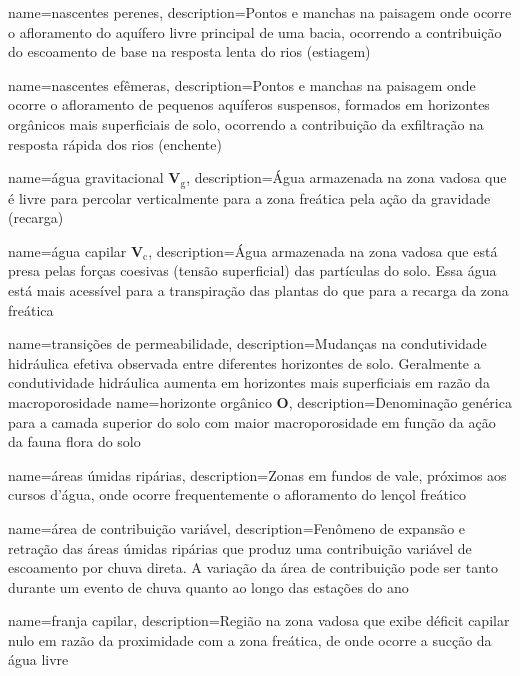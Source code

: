 {
    name=nascentes perenes,
    description={Pontos e manchas na paisagem onde ocorre o afloramento do aquífero livre principal de uma bacia, ocorrendo a contribuição do escoamento de base na resposta lenta do rios (estiagem)}
}

{
    name=nascentes efêmeras,
    description={Pontos e manchas na paisagem onde ocorre o afloramento de pequenos aquíferos suspensos, formados em horizontes orgânicos mais superficiais de solo, ocorrendo a contribuição da exfiltração na resposta rápida dos rios (enchente)}
}

{
    name=água gravitacional $\textbf{V}_{\text{g}}$,
    description={Água armazenada na zona vadosa que é livre para percolar verticalmente para a zona freática pela ação da gravidade (recarga)}
}

{
    name=água capilar $\textbf{V}_{\text{c}}$,
    description={Água armazenada na zona vadosa que está presa pelas forças coesivas (tensão superficial) das partículas do solo. Essa água está mais acessível para a transpiração das plantas do que para a recarga da zona freática}
}

{
    name=transições de permeabilidade,
    description={Mudanças na condutividade hidráulica efetiva observada entre diferentes horizontes de solo. Geralmente a condutividade hidráulica aumenta em horizontes mais superficiais em razão da macroporosidade}
}
{
    name=horizonte orgânico $\textbf{O}$,
    description={Denominação genérica para a camada superior do solo com maior macroporosidade em função da ação da fauna flora do solo}
}

{
    name=áreas úmidas ripárias,
    description={Zonas em fundos de vale, próximos aos cursos d'água, onde ocorre frequentemente o afloramento do lençol freático}
}

{
    name=área de contribuição variável,
    description={Fenômeno de expansão e retração das áreas úmidas ripárias que produz uma contribuição variável de escoamento por chuva direta. A variação da área de contribuição pode ser tanto durante um evento de chuva quanto ao longo das estações do ano}
}

{
    name=franja capilar,
    description={Região na zona vadosa que exibe déficit capilar nulo em razão da proximidade com a zona freática, de onde ocorre a sucção da água livre}
}


